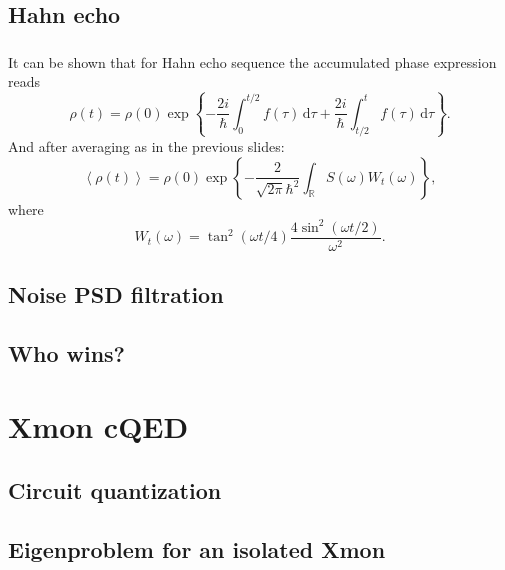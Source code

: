 \documentclass[aspectratio=169, 13pt]{beamer}
\newcommand{\diff}{\,\mathrm{d}}
\begin{document}
\subsection{Hahn echo}
\begin{frame}[c]\frametitle{\secname}\framesubtitle{\subsecname}
It can be shown that for Hahn echo sequence the accumulated phase expression reads
\begin{equation*}
\rho(t) = \rho(0)\exp \left\{ - \frac{2i}{\hbar}\int_0^{t/2} f(\tau)  \diff \tau + \frac{2i}{\hbar}\int_{t/2}^{t} f(\tau)  \diff \tau \right\}.
\end{equation*}
And after averaging as in the previous slides:
\[
\left<\rho(t)\right> = \rho(0)\exp \left\{ - \frac{2}{\sqrt{2\pi} \hbar^2} \int_\mathbb{R} S(\omega) W_t (\omega) \right\},
\label{eq:cdeph_se}
\]
where
\[
W_t (\omega) = \tan^2(\omega t/4)\frac{4 \sin^2(\omega t/2)}{\omega^2}.
\]
\end{frame}

\subsection{Noise PSD filtration}
\begin{frame}[c]\frametitle{\secname}\framesubtitle{\subsecname}

\end{frame}

\subsection{Who wins?}
\begin{frame}[c]\frametitle{\secname}\framesubtitle{\subsecname}

\end{frame}

\section{Xmon cQED}


\subsection{Circuit quantization}
\frame{\frametitle{\secname}\framesubtitle{\subsecname}

}

\subsection{Eigenproblem for an isolated Xmon}
\frame{\frametitle{\secname}\framesubtitle{\subsecname}


}
\end{document}
